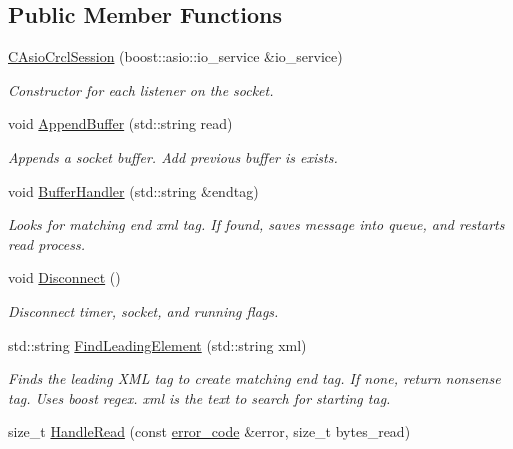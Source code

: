 \subsection*{Public Member Functions}
\begin{DoxyCompactItemize}
\item 
\hyperlink{classCAsioCrclSession_a298356c3c45e1bdfbe7f51d801cb2662}{C\-Asio\-Crcl\-Session} (boost\-::asio\-::io\-\_\-service \&io\-\_\-service)
\begin{DoxyCompactList}\small\item\em Constructor for each listener on the socket. \end{DoxyCompactList}\item 
void \hyperlink{classCAsioCrclSession_ace6dde2b11bf63c7c3cfc2805aaa60a5}{Append\-Buffer} (std\-::string read)
\begin{DoxyCompactList}\small\item\em Appends a socket buffer. Add previous buffer is exists. \end{DoxyCompactList}\item 
void \hyperlink{classCAsioCrclSession_a0291ecdea0d4504d91eb2215088b4e45}{Buffer\-Handler} (std\-::string \&endtag)
\begin{DoxyCompactList}\small\item\em Looks for matching end xml tag. If found, saves message into queue, and restarts read process. \end{DoxyCompactList}\item 
void \hyperlink{classCAsioCrclSession_a1c45f365d8736d9b34087e76fd1f64a0}{Disconnect} ()
\begin{DoxyCompactList}\small\item\em Disconnect timer, socket, and running flags. \end{DoxyCompactList}\item 
std\-::string \hyperlink{classCAsioCrclSession_a3c5816856da2e49f5e8e26f16e3b3718}{Find\-Leading\-Element} (std\-::string xml)
\begin{DoxyCompactList}\small\item\em Finds the leading X\-M\-L tag to create matching end tag. If none, return nonsense tag. Uses boost regex.  xml is the text to search for starting tag. \end{DoxyCompactList}\item 
size\-\_\-t \hyperlink{classCAsioCrclSession_a51852690d601358c0937763f3935b82c}{Handle\-Read} (const \hyperlink{AsioCrclServer_8h_ae1179d2a354a7cf13df4d8544a33fd4f}{error\-\_\-code} \&error, size\-\_\-t bytes\-\_\-read)

\end{DoxyCompactItemize}
